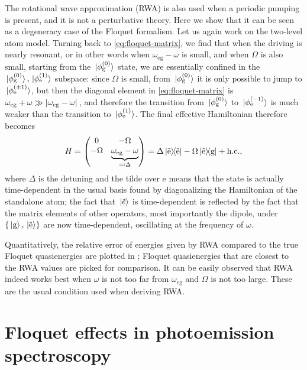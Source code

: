 \documentclass[hyperref, a4paper]{article}
\newcommand*{\omegaeg}{\omega_{\text{eg}}}
\begin{document}
The rotational wave approximation (RWA) is also used 
when a periodic pumping is present, 
and it is not a perturbative theory.
Here we show that it can be seen as a degeneracy case of the Floquet formalism.
Let us again work on the two-level atom model.
Turning back to \eqref{eq:floquet-matrix},
we find that when the driving is nearly resonant, 
or in other words when $\omegaeg - \omega$ is small, 
and when $\Omega$ is also small, starting from the $\ket*{\phi_\text{g}^{(0)}}$ state, 
we are essentially confined in the 
$\ket*{\phi_\text{g}^{(0)}}, \ket*{\phi_{\text{e}}^{(1)}}$ subspace: 
since $\Omega$ is small, 
from $\ket*{\phi_\text{g}^{(0)}}$ it is only possible to jump to 
$\ket*{\phi_\text{e}^{(\pm 1)}}$, 
but then the diagonal element in \eqref{eq:floquet-matrix} is $\omegaeg + \omega \gg \abs*{\omegaeg - \omega}$,
and therefore the transition from $\ket*{\phi_\text{g}^{(0)}}$ to $\ket*{\phi_\text{e}^{(-1)}}$
is much weaker than the transition to $\ket*{\phi_\text{e}^{(1)}}$.
The final effective Hamiltonian therefore becomes 
\begin{equation}
    H = \pmqty{
        0 & - \Omega \\ 
        - \Omega & \underbrace{\omegaeg - \omega}_{\eqqcolon \Delta}
    } =  \Delta \dyad{\tilde{\text{e}}} - \Omega \dyad{\tilde{\text{e}}}{{\text{g}}}  + \text{h.c.}, 
\end{equation}
where $\Delta$ is the detuning and the tilde over e means that 
the state is actually time-dependent in the usual basis 
found by diagonalizing the Hamiltonian of the standalone atom; 
the fact that $\ket*{\tilde{e}}$ is time-dependent is reflected by the fact that 
the matrix elements of other operators, most importantly the dipole, 
under $\{\ket*{\text{g}}, \ket*{\tilde{\text{e}}}\}$ are now time-dependent, 
oscillating at the frequency of $\omega$.

Quantitatively, the relative error of energies given by RWA compared to the true Floquet quasienergies 
are plotted in ; 
Floquet quasienergies that are closest to the RWA values are picked for comparison.
It can be easily observed that RWA indeed works best 
when $\omega$ is not too far from $\omegaeg$ and $\Omega$ is not too large.
These are the usual condition used when deriving RWA.

\section{Floquet effects in photoemission spectroscopy}
\end{document}

